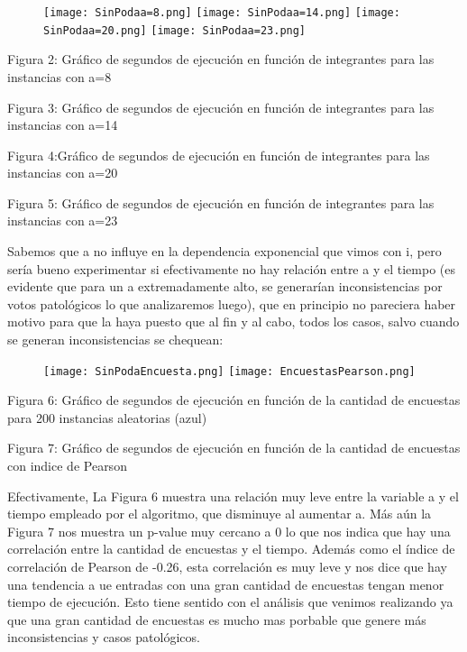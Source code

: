 \documentclass[A4paper,oneside,fleqn,10pt]{article}
\theoremstyle{definition}
\begin{document}
\begin{figure}[h!]
  \texttt{[image: SinPodaa=8.png]}
  \label{fig:boat2}
  \texttt{[image: SinPodaa=14.png]}
  \label{fig:boat3}
  \texttt{[image: SinPodaa=20.png]}
  \label{fig:boat4}
  \texttt{[image: SinPodaa=23.png]}
  \label{fig:boat5}  
\end{figure}
     \scriptsize
     Figura 2: Gráfico de segundos de ejecución en función de integrantes para las instancias con a=8
     
    Figura 3: Gráfico de segundos de ejecución en función de integrantes para las instancias con a=14
    
     Figura 4:Gráfico de segundos de ejecución en función de integrantes para las instancias con a=20
   
   Figura 5: Gráfico de segundos de ejecución en función de integrantes para las instancias con a=23

	\normalsize
  
Sabemos que a no influye en la dependencia exponencial que vimos con i, pero sería bueno experimentar si efectivamente no hay relación entre a y el tiempo (es evidente que para un a extremadamente alto, se generarían inconsistencias por votos patológicos lo que analizaremos luego), que en principio no pareciera haber motivo para que la haya puesto que al fin y al cabo, todos los casos, salvo cuando se generan inconsistencias se chequean:

\begin{figure}[h!]
  \texttt{[image: SinPodaEncuesta.png]}
  \texttt{[image: EncuestasPearson.png]}
  \label{fig:boat6}
\end{figure}

\scriptsize
	Figura 6: Gráfico de segundos de ejecución en función de la cantidad de encuestas para 200 instancias aleatorias (azul)

	Figura 7: Gráfico de segundos de ejecución en función de la cantidad de encuestas con indice de Pearson

\normalsize

Efectivamente, La Figura 6  muestra una relación muy leve entre la variable a y el tiempo empleado por el algoritmo, que disminuye al aumentar a. Más aún la Figura 7 nos muestra un p-value muy cercano a 0 lo que nos indica que hay una correlación entre la cantidad de encuestas y el tiempo. Además como el índice de correlación de Pearson de -0.26, esta correlación es muy leve y nos dice que hay una tendencia a ue entradas con una gran cantidad de encuestas tengan menor tiempo de ejecución. Esto tiene sentido con el análisis que venimos realizando ya que una gran cantidad de encuestas es mucho mas porbable que genere más inconsistencias y casos patológicos.
\end{document}
